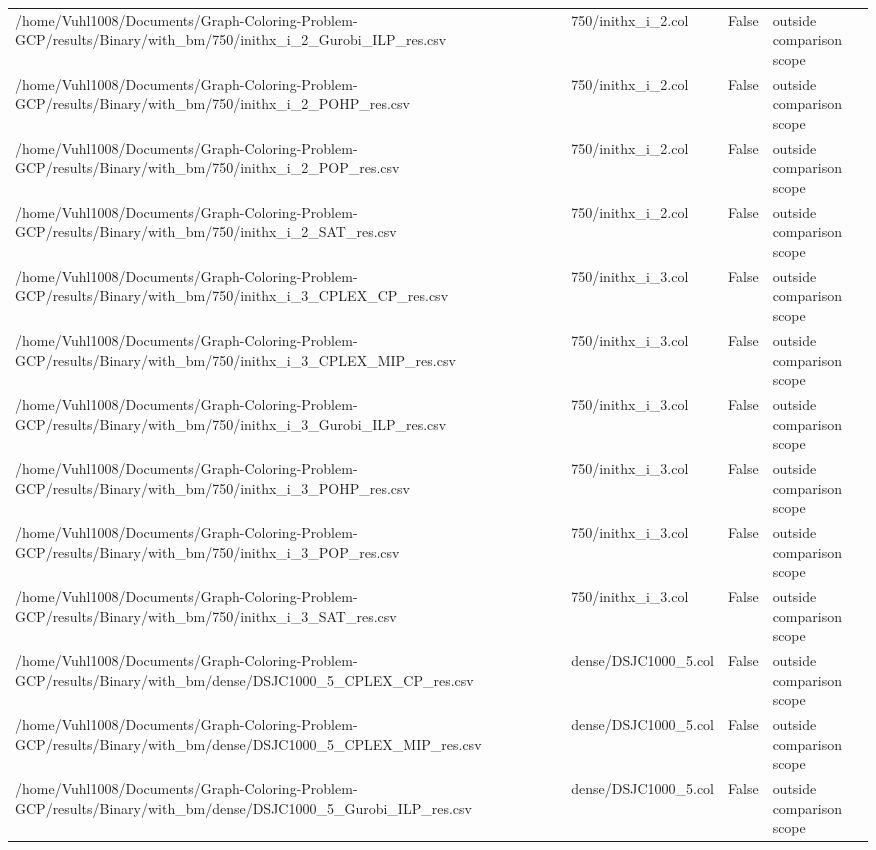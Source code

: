 \begin{table}[htbp]
\begin{tabular}{llll}
/home/Vuhl1008/Documents/Graph-Coloring-Problem-GCP/results/Binary/with\_bm/750/inithx\_i\_2\_Gurobi\_ILP\_res.csv & 750/inithx\_i\_2.col & False & outside comparison scope \\
/home/Vuhl1008/Documents/Graph-Coloring-Problem-GCP/results/Binary/with\_bm/750/inithx\_i\_2\_POHP\_res.csv & 750/inithx\_i\_2.col & False & outside comparison scope \\
/home/Vuhl1008/Documents/Graph-Coloring-Problem-GCP/results/Binary/with\_bm/750/inithx\_i\_2\_POP\_res.csv & 750/inithx\_i\_2.col & False & outside comparison scope \\
/home/Vuhl1008/Documents/Graph-Coloring-Problem-GCP/results/Binary/with\_bm/750/inithx\_i\_2\_SAT\_res.csv & 750/inithx\_i\_2.col & False & outside comparison scope \\
/home/Vuhl1008/Documents/Graph-Coloring-Problem-GCP/results/Binary/with\_bm/750/inithx\_i\_3\_CPLEX\_CP\_res.csv & 750/inithx\_i\_3.col & False & outside comparison scope \\
/home/Vuhl1008/Documents/Graph-Coloring-Problem-GCP/results/Binary/with\_bm/750/inithx\_i\_3\_CPLEX\_MIP\_res.csv & 750/inithx\_i\_3.col & False & outside comparison scope \\
/home/Vuhl1008/Documents/Graph-Coloring-Problem-GCP/results/Binary/with\_bm/750/inithx\_i\_3\_Gurobi\_ILP\_res.csv & 750/inithx\_i\_3.col & False & outside comparison scope \\
/home/Vuhl1008/Documents/Graph-Coloring-Problem-GCP/results/Binary/with\_bm/750/inithx\_i\_3\_POHP\_res.csv & 750/inithx\_i\_3.col & False & outside comparison scope \\
/home/Vuhl1008/Documents/Graph-Coloring-Problem-GCP/results/Binary/with\_bm/750/inithx\_i\_3\_POP\_res.csv & 750/inithx\_i\_3.col & False & outside comparison scope \\
/home/Vuhl1008/Documents/Graph-Coloring-Problem-GCP/results/Binary/with\_bm/750/inithx\_i\_3\_SAT\_res.csv & 750/inithx\_i\_3.col & False & outside comparison scope \\
/home/Vuhl1008/Documents/Graph-Coloring-Problem-GCP/results/Binary/with\_bm/dense/DSJC1000\_5\_CPLEX\_CP\_res.csv & dense/DSJC1000\_5.col & False & outside comparison scope \\
/home/Vuhl1008/Documents/Graph-Coloring-Problem-GCP/results/Binary/with\_bm/dense/DSJC1000\_5\_CPLEX\_MIP\_res.csv & dense/DSJC1000\_5.col & False & outside comparison scope \\
/home/Vuhl1008/Documents/Graph-Coloring-Problem-GCP/results/Binary/with\_bm/dense/DSJC1000\_5\_Gurobi\_ILP\_res.csv & dense/DSJC1000\_5.col & False & outside comparison scope \\

\end{tabular}
\end{table}
